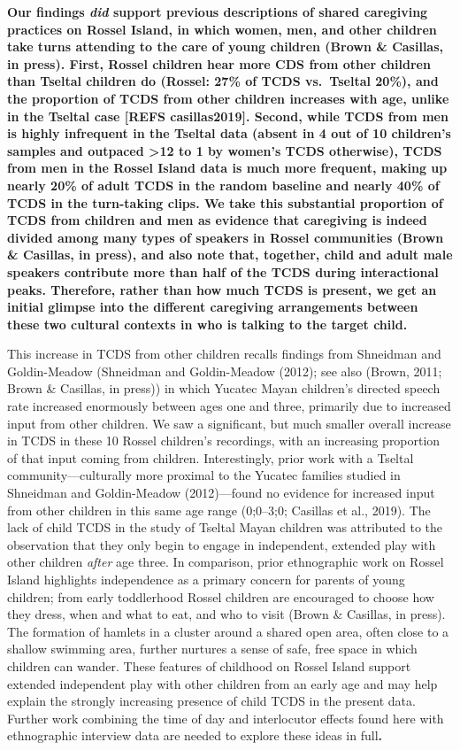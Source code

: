 \documentclass[,man,floatsintext]{apa6}
\begin{document}
\textbf{Our findings \emph{did} support previous descriptions of shared
caregiving practices on Rossel Island, in which women, men, and other
children take turns attending to the care of young children (Brown \&
Casillas, in press). First, Rossel children hear more CDS from other
children than Tseltal children do (Rossel: 27\% of TCDS vs.~Tseltal
20\%), and the proportion of TCDS from other children increases with
age, unlike in the Tseltal case {[}REFS casillas2019{]}. Second, while
TCDS from men is highly infrequent in the Tseltal data (absent in 4 out
of 10 children's samples and outpaced \textgreater{}12 to 1 by women's
TCDS otherwise), TCDS from men in the Rossel Island data is much more
frequent, making up nearly 20\% of adult TCDS in the random baseline and
nearly 40\% of TCDS in the turn-taking clips. We take this substantial
proportion of TCDS from children and men as evidence that caregiving is
indeed divided among many types of speakers in Rossel communities (Brown
\& Casillas, in press), and also note that, together, child and adult
male speakers contribute more than half of the TCDS during interactional
peaks. Therefore, rather than how much TCDS is present, we get an
initial glimpse into the different caregiving arrangements between these
two cultural contexts in who is talking to the target child.}

This increase in TCDS from other children recalls findings from
Shneidman and Goldin-Meadow (Shneidman and Goldin-Meadow (2012); see
also (Brown, 2011; Brown \& Casillas, in press)) in which Yucatec Mayan
children's directed speech rate increased enormously between ages one
and three, primarily due to increased input from other children. We saw
a significant, but much smaller overall increase in TCDS in these 10
Rossel children's recordings, with an increasing proportion of that
input coming from children. Interestingly, prior work with a Tseltal
community---culturally more proximal to the Yucatec families studied in
Shneidman and Goldin-Meadow (2012)---found no evidence for increased
input from other children in this same age range (0;0--3;0; Casillas et
al., 2019). The lack of child TCDS in the study of Tseltal Mayan
children was attributed to the observation that they only begin to
engage in independent, extended play with other children \emph{after}
age three. In comparison, prior ethnographic work on Rossel Island
highlights independence as a primary concern for parents of young
children; from early toddlerhood Rossel children are encouraged to
choose how they dress, when and what to eat, and who to visit (Brown \&
Casillas, in press). The formation of hamlets in a cluster around a
shared open area, often close to a shallow swimming area, further
nurtures a sense of safe, free space in which children can wander. These
features of childhood on Rossel Island support extended independent play
with other children from an early age and may help explain the strongly
increasing presence of child TCDS in the present data. Further work
combining the time of day and interlocutor effects found here with
ethnographic interview data are needed to explore these ideas in
full\textbf{.}
\end{document}
